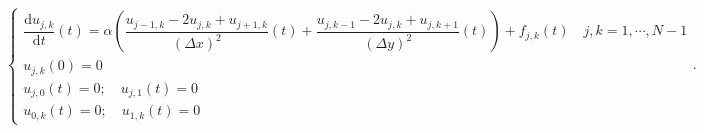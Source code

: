 \documentclass[../main.tex]{subfiles}
\begin{document}
\[
\begin{cases}
	\dfrac{\mathrm{d}u_{j,k}}{\mathrm{d}t}(t) = \alpha
	\left(
		\dfrac{u_{j-1,k}-2u_{j,k}+u_{j+1,k}}{(\Delta x)^{2}}(t)
		+
		\dfrac{u_{j,k-1}-2u_{j,k}+u_{j,k+1}}{(\Delta y)^{2}}(t)
	\right) +
	f_{j,k}(t)
	\quad
	j,k = 1,\cdots,N-1\\
	u_{j,k}(0)=0\\
	u_{j,0}(t)=0;\quad u_{j,1}(t)=0\\
	u_{0,k}(t)=0;\quad u_{1,k}(t)=0
\end{cases}
.\] 
	
\end{document}
